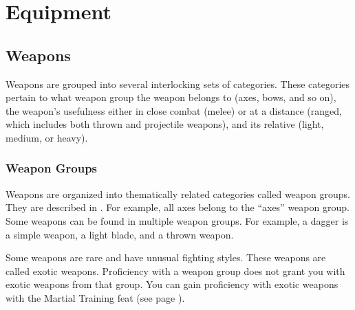 \chapter{Equipment}

\section{Weapons}\label{Weapons}

    Weapons are grouped into several interlocking sets of categories. These categories pertain to what weapon group the weapon belongs to (axes, bows, and so on), the weapon's usefulness either in close combat (melee) or at a distance (ranged, which includes both thrown and projectile weapons), and its relative  (light, medium, or heavy).

    \subsection{Weapon Groups}\label{Weapon Groups}

        Weapons are organized into thematically related categories called weapon groups. They are described in . For example, all axes belong to the ``axes'' weapon group. Some weapons can be found in multiple weapon groups. For example, a dagger is a simple weapon, a light blade, and a thrown weapon.

        \label{Exotic Weapons} Some weapons are rare and have unusual fighting styles.
        These weapons are called exotic weapons.
        Proficiency with a weapon group does not grant you with exotic weapons from that group.
        You can gain proficiency with exotic weapons with the Martial Training feat (see page ).

